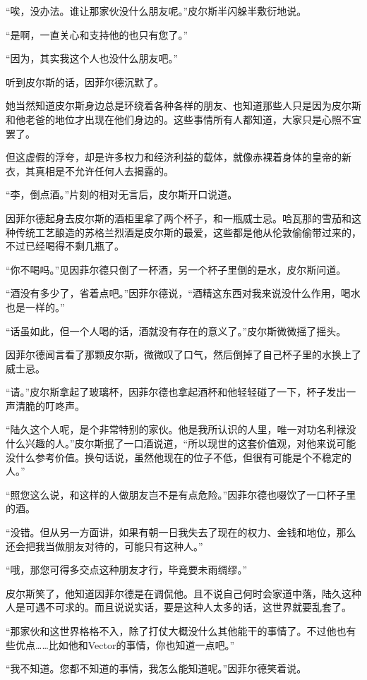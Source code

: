 “唉，没办法。谁让那家伙没什么朋友呢。”皮尔斯半闪躲半敷衍地说。

“是啊，一直关心和支持他的也只有您了。”

“因为，其实我这个人也没什么朋友吧。”

听到皮尔斯的话，因菲尔德沉默了。

她当然知道皮尔斯身边总是环绕着各种各样的朋友、也知道那些人只是因为皮尔斯和他老爸的地位才出现在他们身边的。这些事情所有人都知道，大家只是心照不宣罢了。

但这虚假的浮夸，却是许多权力和经济利益的载体，就像赤裸着身体的皇帝的新衣，其真相是不允许任何人去揭露的。

“李，倒点酒。”片刻的相对无言后，皮尔斯开口说道。

因菲尔德起身去皮尔斯的酒柜里拿了两个杯子，和一瓶威士忌。哈瓦那的雪茄和这种传统工艺酿造的苏格兰烈酒是皮尔斯的最爱，这些都是他从伦敦偷偷带过来的，不过已经喝得不剩几瓶了。

“你不喝吗。”见因菲尔德只倒了一杯酒，另一个杯子里倒的是水，皮尔斯问道。

“酒没有多少了，省着点吧。”因菲尔德说，“酒精这东西对我来说没什么作用，喝水也是一样的。”

“话虽如此，但一个人喝的话，酒就没有存在的意义了。”皮尔斯微微摇了摇头。

因菲尔德闻言看了那颗皮尔斯，微微叹了口气，然后倒掉了自己杯子里的水换上了威士忌。

“请。”皮尔斯拿起了玻璃杯，因菲尔德也拿起酒杯和他轻轻碰了一下，杯子发出一声清脆的叮咚声。

“陆久这个人呢，是个非常特别的家伙。他是我所认识的人里，唯一对功名利禄没什么兴趣的人。”皮尔斯抿了一口酒说道，“所以现世的这套价值观，对他来说可能没什么参考价值。换句话说，虽然他现在的位子不低，但很有可能是个不稳定的人。”

“照您这么说，和这样的人做朋友岂不是有点危险。”因菲尔德也啜饮了一口杯子里的酒。

“没错。但从另一方面讲，如果有朝一日我失去了现在的权力、金钱和地位，那么还会把我当做朋友对待的，可能只有这种人。”

“哦，那您可得多交点这种朋友才行，毕竟要未雨绸缪。”

皮尔斯笑了，他知道因菲尔德是在调侃他。且不说自己何时会家道中落，陆久这种人是可遇不可求的。而且说说实话，要是这种人太多的话，这世界就要乱套了。

“那家伙和这世界格格不入，除了打仗大概没什么其他能干的事情了。不过他也有些优点……比如他和Vector的事情，你也知道一点吧。”

“我不知道。您都不知道的事情，我怎么能知道呢。”因菲尔德笑着说。

